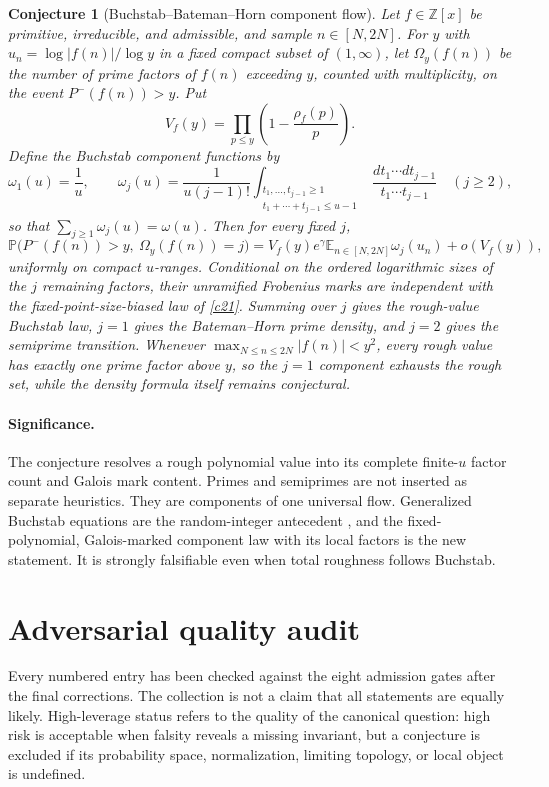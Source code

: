 \documentclass[11pt]{article}
\newtheorem{conjecture}{Conjecture}
\newcommand{\E}{\mathbb E}
\newcommand{\Pp}{\mathbb P}
\newcommand{\Z}{\mathbb Z}
\begin{document}
\begin{conjecture}[Buchstab--Bateman--Horn component flow]\label{c25}
Let $f\in\Z[x]$ be primitive, irreducible, and admissible, and sample
$n\in[N,2N]$.  For $y$ with
$u_n=\log|f(n)|/\log y$ in a fixed compact subset of $(1,\infty)$, let
$\Omega_y(f(n))$ be the number of prime factors of $f(n)$ exceeding $y$, counted with
multiplicity, on the event $P^-(f(n))>y$.  Put
\[
 V_f(y)=\prod_{p\le y}\left(1-\frac{\rho_f(p)}p\right).
\]
Define the Buchstab component functions by
\[
 \omega_1(u)=\frac1u,
 \qquad
 \omega_j(u)=\frac{1}{u(j-1)!}
 \int_{\substack{t_1,\ldots,t_{j-1}\ge1\\
 t_1+\cdots+t_{j-1}\le u-1}}
 \frac{dt_1\cdots dt_{j-1}}{t_1\cdots t_{j-1}}
 \quad(j\ge2),
\]
so that $\sum_{j\ge1}\omega_j(u)=\omega(u)$.  Then for every fixed $j$,
\[
 \Pp\bigl(P^-(f(n))>y,\ \Omega_y(f(n))=j\bigr)
 =V_f(y)e^\gamma\E_{n\in[N,2N]}\omega_j(u_n)+o(V_f(y)),
\]
uniformly on compact $u$-ranges.  Conditional on the ordered logarithmic sizes of the
$j$ remaining factors, their unramified Frobenius marks are independent with the
fixed-point-size-biased law of \cref{c21}.  Summing over $j$ gives the rough-value
Buchstab law, $j=1$ gives the Bateman--Horn prime density, and $j=2$ gives the
semiprime transition.  Whenever $\max_{N\le n\le2N}|f(n)|<y^2$, every rough value has exactly one prime
factor above $y$, so the $j=1$ component exhausts the rough set, while the density
formula itself remains conjectural.
\end{conjecture}

\paragraph{Significance.}
The conjecture resolves a rough polynomial value into its complete finite-$u$ factor
count and Galois mark content.  Primes and semiprimes are not inserted as separate
heuristics.  They are components of one universal flow.  Generalized Buchstab equations
are the random-integer antecedent \cite{Moree}, and the fixed-polynomial,
Galois-marked component law with its local factors is the new statement.  It is strongly falsifiable even when
total roughness follows Buchstab.


\section{Adversarial quality audit}

Every numbered entry has been checked against the eight admission gates after the final
corrections.  The collection is not a claim that all statements are equally likely.
High-leverage status refers to the quality of the canonical question: high risk is acceptable
when falsity reveals a missing invariant, but a conjecture is excluded if its probability
space, normalization, limiting topology, or local object is undefined.
\end{document}
